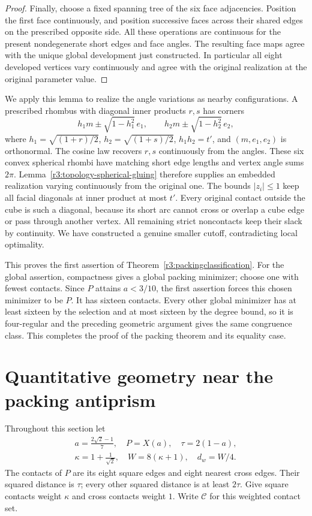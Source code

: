 \documentclass[12pt,reqno]{amsart}
\theoremstyle{definition}
\numberwithin{equation}{section}
\begin{document}
\begin{proof}
Finally, choose a fixed spanning tree of the six face adjacencies.
Position the first face continuously, and position successive faces
across their shared edges on the prescribed opposite side. All these
operations are continuous for the present nondegenerate short edges
and face angles. The resulting face maps agree with the unique global
development just constructed. In particular all eight developed
vertices vary continuously and agree with the original realization
at the original parameter value.
\end{proof}

We apply this lemma to realize the angle variations as nearby configurations. A prescribed rhombus with diagonal inner products $r,s$ has
corners
\[
 h_1m\pm\sqrt{1-h_1^2}\,e_1,\qquad
 h_2m\pm\sqrt{1-h_2^2}\,e_2,
\]
where $h_1=\sqrt{(1+r)/2}$, $h_2=\sqrt{(1+s)/2}$, $h_1h_2=t'$, and
$(m,e_1,e_2)$ is orthonormal. The cosine law recovers $r,s$ continuously
from the angles. These six convex spherical rhombi have matching short
edge lengths and vertex angle sums $2\pi$. Lemma~\ref{r3:topology-spherical-gluing}
therefore supplies an embedded realization varying continuously from the
original one.
The bounds $|z_i|\le1$ keep all facial diagonals at inner product at most
$t'$. Every original contact outside the cube is such a diagonal, because
its short arc cannot cross or overlap a cube edge or pass through another
vertex. All remaining strict noncontacts keep their slack by continuity.
We have constructed a genuine smaller cutoff, contradicting local optimality.

This proves the first assertion of Theorem~\ref{r3:packingclassification}.
For the global assertion, compactness gives a global packing minimizer;
choose one with fewest contacts. Since $P$ attains $a<3/10$, the first
assertion forces this chosen minimizer to be $P$. It has sixteen contacts.
Every other global minimizer has at least sixteen by the selection and
at most sixteen by the degree bound, so it is four-regular and the preceding
geometric argument gives the same congruence class. This completes the
proof of the packing theorem and its equality case.


\section{Quantitative geometry near the packing antiprism}\label{sec:geometry}
Throughout this section let
\[
\begin{gathered}
 a=\frac{2\sqrt2-1}{7},\quad P=X(a),\quad \tau=2(1-a),\\
 \kappa=1+\frac1{\sqrt2},\quad W=8(\kappa+1),\quad d_w=W/4.
\end{gathered}
\]
The contacts of $P$ are its eight square edges and eight nearest cross
edges. Their squared distance is $\tau$; every other squared distance
is at least $2\tau$. Give square contacts weight $\kappa$ and cross
contacts weight $1$. Write $\mathcal C$ for this weighted contact set.
\end{document}
